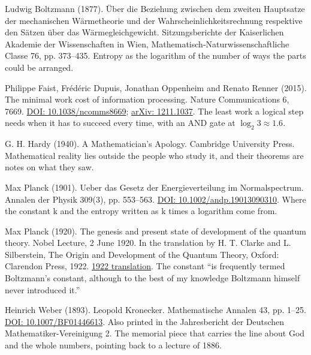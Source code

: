 \noindent Ludwig Boltzmann (1877). \"Uber die Beziehung zwischen dem zweiten Hauptsatze der mechanischen W\"armetheorie und der Wahrscheinlichkeitsrechnung respektive den S\"atzen \"uber das W\"armegleichgewicht. Sitzungsberichte der Kaiserlichen Akademie der Wissenschaften in Wien, Mathematisch-Naturwissenschaftliche Classe 76, pp. 373--435. Entropy as the logarithm of the number of ways the parts could be arranged.
\par\medskip

\noindent Philippe Faist, Fr\'ed\'eric Dupuis, Jonathan Oppenheim and Renato Renner (2015). The minimal work cost of information processing. Nature Communications 6, 7669. \href{https://doi.org/10.1038/ncomms8669}{DOI: 10.1038/ncomms8669}; \href{https://arxiv.org/abs/1211.1037}{arXiv: 1211.1037}. The least work a logical step needs when it has to succeed every time, with an AND gate at $\log_2 3 \approx 1.6$.
\par\medskip

\noindent G. H. Hardy (1940). A Mathematician's Apology. Cambridge University Press. Mathematical reality lies outside the people who study it, and their theorems are notes on what they saw.
\par\medskip

\noindent Max Planck (1901). Ueber das Gesetz der Energieverteilung im Normalspectrum. Annalen der Physik 309(3), pp. 553--563. \href{https://doi.org/10.1002/andp.19013090310}{DOI: 10.1002/andp.19013090310}. Where the constant k and the entropy written as k times a logarithm come from.
\par\medskip

\noindent Max Planck (1920). The genesis and present state of development of the quantum theory. Nobel Lecture, 2 June 1920. In the translation by H. T. Clarke and L. Silberstein, The Origin and Development of the Quantum Theory, Oxford: Clarendon Press, 1922. \href{https://www.gutenberg.org/cache/epub/33663/pg33663-images.html}{1922 translation}. The constant ``is frequently termed Boltzmann's constant, although to the best of my knowledge Boltzmann himself never introduced it.''
\par\medskip

\noindent Heinrich Weber (1893). Leopold Kronecker. Mathematische Annalen 43, pp. 1--25. \href{https://doi.org/10.1007/BF01446613}{DOI: 10.1007/BF01446613}. Also printed in the Jahresbericht der Deutschen Mathematiker-Vereinigung 2. The memorial piece that carries the line about God and the whole numbers, pointing back to a lecture of 1886.
\par\medskip

